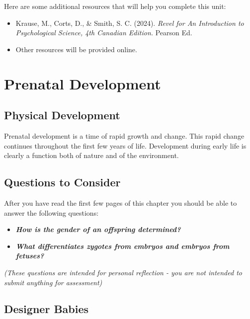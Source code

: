 \documentclass[
]{book}
\providecommand{\tightlist}{%
  \setlength{\itemsep}{0pt}\setlength{\parskip}{0pt}}
\begin{document}
Here are some additional resources that will help you complete this unit:

\begin{itemize}
\tightlist
\item
  Krause, M., Corts, D., \& Smith, S. C. (2024). \emph{Revel for An Introduction to Psychological Science, 4th Canadian Edition.} Pearson Ed.
\item
  Other resources will be provided online.
\end{itemize}

\hypertarget{prenatal-development}{%
\section{Prenatal Development}\label{prenatal-development}}

\hypertarget{physical-development}{%
\subsection*{Physical Development}\label{physical-development}}

Prenatal development is a time of rapid growth and change. This rapid change continues throughout the first few years of life. Development during early life is clearly a function both of nature and of the environment.

\hypertarget{questions-to-consider}{%
\subsection*{Questions to Consider}\label{questions-to-consider}}

After you have read the first few pages of this chapter you should be able to answer the following questions:

\begin{itemize}
\tightlist
\item
  \textbf{\emph{How is the gender of an offspring determined?}}\\
\item
  \textbf{\emph{What differentiates zygotes from embryos and embryos from fetuses?}}
\end{itemize}

\emph{(These questions are intended for personal reflection - you are not intended to submit anything for assessment)}

\hypertarget{designer-babies}{%
\subsection*{Designer Babies}\label{designer-babies}}
\end{document}
